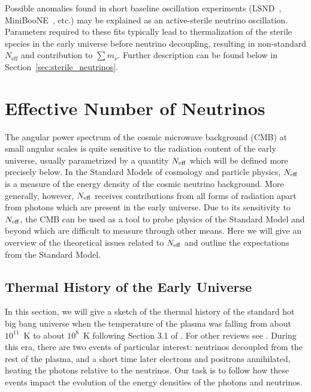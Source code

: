 Possible anomalies found in short baseline oscillation experiments (LSND~\cite{Aguilar:2001ty},
MiniBooNE~\cite{AguilarArevalo:2010wv}, etc.) may be explained as an active-sterile neutrino
oscillation.  Parameters required to these fits typically lead to
thermalization of the sterile species in the early universe before
neutrino decoupling, resulting in non-standard $N_\mathrm{eff}$ and
contribution to $\sum m_\nu$.  Further description can be found
below in Section~\ref{sec:sterile_neutrinos}.

\section{Effective Number of Neutrinos}


The angular power spectrum of the cosmic microwave background (CMB) at small angular scales is quite sensitive to the radiation content of the early universe, usually parametrized by a quantity $N_{\rm eff}$ which will be defined more precisely below.  In the Standard Models of cosmology and particle physics, $N_{\rm eff}$ is a measure of the energy density of the cosmic neutrino background.  More generally, however, $N_{\rm eff}$ receives contributions from all forms of radiation apart from photons which are present in the early universe.  Due to its sensitivity to $N_{\rm eff}$, the CMB can be used as a tool to probe physics of the Standard Model and beyond which are difficult to measure through other means.  Here we will give an overview of the theoretical issues related to $N_{\rm eff}$ and outline the expectations from the Standard Model.

\subsection{Thermal History of the Early Universe} \label{ThermalHistory}
In this section, we will give a sketch of the thermal history of the standard hot big bang universe when the temperature of the plasma was falling from about $10^{11}$~K to about $10^8$~K following Section 3.1 of \cite{Weinberg:2008zzc}.  For other reviews see \cite{Dolgov:2002wy,Agashe:2014kda}.  During this era, there are two events of particular interest: neutrinos decoupled from the rest of the plasma, and a short time later electrons and positrons annihilated, heating the photons relative to the neutrinos.  Our task is to follow how these events impact the evolution of the energy densities of the photons and neutrinos.

